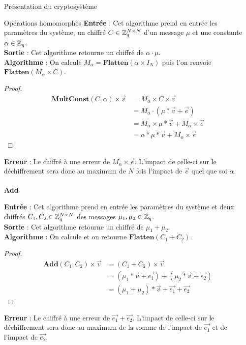 \begin{section}{Présentation du cryptosystème}
\begin{subsection}{Opérations homomorphes}
	\textbf{Entrée} : Cet algorithme prend en entrée les paramètres du système, un chiffré $C \in \mathbb{Z}_q^{N \times N}$ d'un message $\mu$ et une constante $\alpha \in \mathbb{Z}_q$. \\
	\textbf{Sortie} : Cet algorithme retourne un chiffré de $\alpha \cdot \mu$.\\
	\textbf{Algorithme} : On calcule $M_{\alpha} = \textbf{Flatten}(\alpha \times I_N)$ puis l'on renvoie $\textbf{Flatten}(M_{\alpha} \times C)$.
	\begin{proof}
	\begin{align*}
	\textbf{MultConst}(C, \alpha) \times \vec{v} &= M_{\alpha} \times C \times \vec{v} \\
	&= M_{\alpha} \cdot (\mu * \vec{v} + \vec{e}) \\
	&= M_{\alpha} \times \mu * \vec{v} + M_{\alpha} \times \vec{e} \\
	&= \alpha * \mu * \vec{v} + M_{\alpha} \times \vec{e}
	\end{align*}
	\end{proof}
	\textbf{Erreur} : Le chiffré à une erreur de $M_\alpha \times \vec{e}$. L'impact de celle-ci sur le déchiffrement sera donc au maximum de $N$ fois l'impact de $\vec{e}$ quel que soi $\alpha$.
	
	\paragraph{}
	\textbf{Add}
	\flushleft
	
	\textbf{Entrée} : Cet algorithme prend en entrée les paramètres du système et deux chiffrés $C_1, C_2 \in \mathbb{Z}_q^{N \times N}$ des messages $\mu_1, \mu_2 \in \mathbb{Z}_q$.\\
	\textbf{Sortie} : Cet algorithme retourne un chiffré de $\mu_1 + \mu_2$.\\
	\textbf{Algorithme} : On calcule et on retourne $\textbf{Flatten}(C_1 + C_2)$.
	\begin{proof}
	\begin{align*}
	\textbf{Add}(C_1, C_2) \times \vec{v} &= (C_1 + C_2) \times \vec{v} \\
	&= (\mu_1 * \vec{v} + \vec{e_1}) + (\mu_2 * \vec{v} + \vec{e_2}) \\
	&= (\mu_1 + \mu_2) * \vec{v} + \vec{e_1} + \vec{e_2}
	\end{align*}
	\end{proof}
	\textbf{Erreur} : Le chiffré à une erreur de $\vec{e_1} + \vec{e_2}$. L'impact de celle-ci sur le déchiffrement sera donc au maximum de la somme de l'impact de $\vec{e_1}$ et de l'impact de $\vec{e_2}$.
	

\end{subsection}
\end{section}
